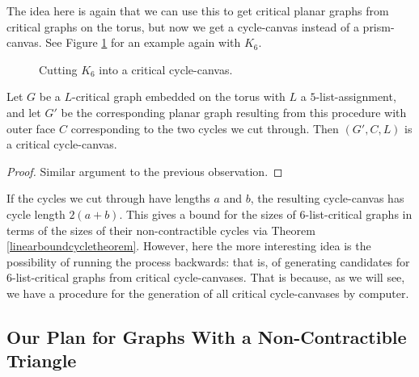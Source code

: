 The idea here is again that we can use this to get critical planar graphs from critical graphs
on the torus, but now we get a cycle-canvas instead of a prism-canvas. See Figure \ref{fig:k6_cyclecanvas} for an example again with $K_6$.

\begin{figure}
\label{fig:k6_cyclecanvas}
\centering
{}
\caption{Cutting $K_6$ into a critical cycle-canvas.}
\end{figure}

\begin{observation}
Let $G$ be a $L$-critical graph embedded on the torus with $L$ a $5$-list-assignment,
and let $G'$ be the corresponding planar graph resulting from this procedure with outer face $C$
corresponding to the two cycles we cut through. Then $(G', C, L)$ is a critical cycle-canvas.
\end{observation}

\begin{proof}
Similar argument to the previous observation.
\end{proof}

If the cycles we cut through have lengths $a$ and $b$, the resulting cycle-canvas has cycle length
$2(a+b)$. This gives a bound for the sizes of $6$-list-critical graphs in terms of the sizes of 
their non-contractible cycles via Theorem \ref{linearboundcycletheorem}. However, here the more
interesting idea is the possibility of running the process backwards: that is, of generating
candidates for $6$-list-critical graphs from critical cycle-canvases. 
That is because, as we will see, we have a procedure for the generation of all critical
cycle-canvases by computer. 


\subsection{Our Plan for Graphs With a Non-Contractible Triangle}



